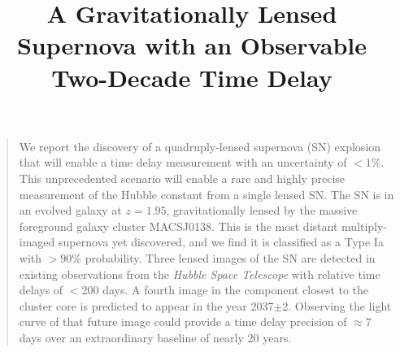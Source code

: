 \documentclass[12pt,dvipsnames]{article}
\title{A Gravitationally Lensed Supernova with an Observable Two-Decade Time Delay}
\date{}
\newenvironment{sciabstract}{%
\begin{quote} \bf}
{\end{quote}}
\begin{document}
 


\baselineskip24pt


\maketitle 




\begin{sciabstract}
  
  We report the discovery of a quadruply-lensed supernova (SN) explosion that will enable a time delay measurement with an uncertainty of $<1\%$. This unprecedented scenario will enable a rare and highly precise measurement of the Hubble constant from a single lensed SN.  The SN is in an evolved galaxy at $z=1.95$, gravitationally lensed by the massive foreground galaxy cluster MACSJ0138.  
 This is the most distant multiply-imaged supernova yet discovered, and we find it is classified as a Type Ia with {$>90\%$} probability.
  Three lensed images of the SN are detected in existing observations from the \textit{Hubble Space Telescope} with relative time delays of $<$200 days.  A fourth image in the component closest to the cluster core is predicted to appear in the year 2037$\pm$2.  Observing the light curve of that future image could provide a time delay precision of $\approx 7$ days over an extraordinary baseline of nearly 20 years. 
  
  

\end{sciabstract}


\end{document}
